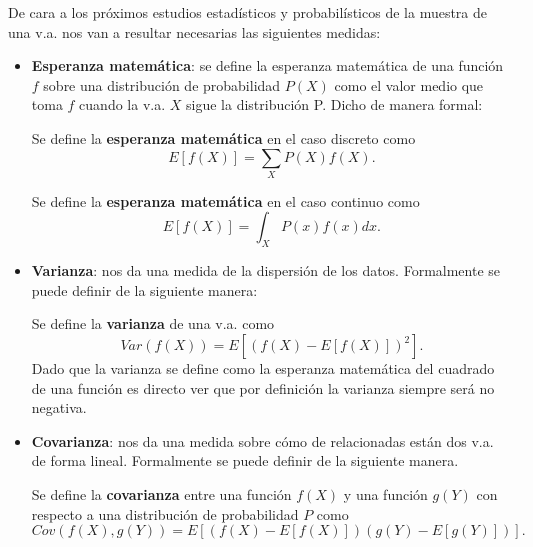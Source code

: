 De cara a los próximos estudios estadísticos y probabilísticos de la muestra de una \ac{v.a.} nos van a resultar necesarias las siguientes medidas:
\begin{itemize}
    \item \textbf{Esperanza matemática}: se define la esperanza matemática de una función $f$ sobre una distribución de probabilidad $P(X)$ como el valor medio que toma $f$ cuando la \ac{v.a.} $X$ sigue la distribución P. Dicho de manera formal:
    
    \begin{definition}
        Se define la \textbf{esperanza matemática} en el caso discreto como
        \begin{equation}
            E[f(X)]=\sum_X P(X)f(X).
        \end{equation}
    \end{definition}
    
    \begin{definition}
        Se define la \textbf{esperanza matemática} en el caso continuo como
        \begin{equation}
            E[f(X)]=\int_X P(x)f(x)dx.
        \end{equation}
    \end{definition}

    \item \textbf{Varianza}: nos da una medida de la dispersión de los datos. Formalmente se puede definir de la siguiente manera:
    \begin{definition}
        Se define la \textbf{varianza} de una \ac{v.a.} como
        \begin{equation}
            Var(f(X)) = E[(f(X) - E[f(X)])^2].
        \end{equation}
        Dado que la varianza se define como la esperanza matemática del cuadrado de una función es directo ver que por definición la varianza siempre será no negativa.
    \end{definition}

    \item \textbf{Covarianza}: nos da una medida sobre cómo de relacionadas están dos \ac{v.a.} de forma lineal. Formalmente se puede definir de la siguiente manera.
    \begin{definition}
        Se define la \textbf{covarianza} entre una función $f(X)$ y una función $g(Y)$ con respecto a una distribución de probabilidad $P$ como
        \begin{equation}
            Cov(f(X), g(Y))=E[(f(X) - E[f(X)])(g(Y) - E[g(Y)])].
        \end{equation}
    \end{definition}


\end{itemize}
